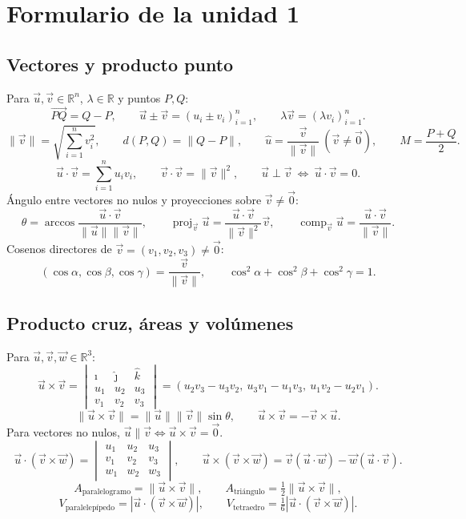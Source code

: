 ﻿\section{Formulario de la unidad 1}
\begingroup
\small
\setlength{\parindent}{0pt}
\setlength{\abovedisplayskip}{7pt}
\setlength{\belowdisplayskip}{7pt}

\subsection*{Vectores y producto punto}
Para $\vec u,\vec v\in\mathbb R^n$, $\lambda\in\mathbb R$ y puntos $P,Q$:
\[
\overrightarrow{PQ}=Q-P,\qquad
\vec u\pm\vec v=(u_i\pm v_i)_{i=1}^n,\qquad
\lambda\vec v=(\lambda v_i)_{i=1}^n.
\]
\[
\|\vec v\|=\sqrt{\sum_{i=1}^n v_i^2},\qquad
d(P,Q)=\|Q-P\|,\qquad
\hat u=\frac{\vec v}{\|\vec v\|}\ (\vec v\ne\vec0),\qquad
M=\frac{P+Q}{2}.
\]
\[
\vec u\cdot\vec v=\sum_{i=1}^n u_iv_i,\qquad
\vec v\cdot\vec v=\|\vec v\|^2,\qquad
\vec u\perp\vec v\ \Longleftrightarrow\ \vec u\cdot\vec v=0.
\]
Ángulo entre vectores no nulos y proyecciones sobre $\vec v\ne\vec0$:
\[
\theta=\arccos\frac{\vec u\cdot\vec v}{\|\vec u\|\|\vec v\|},\qquad
\operatorname{proj}_{\vec v}\vec u=\frac{\vec u\cdot\vec v}{\|\vec v\|^2}\vec v,
\qquad
\operatorname{comp}_{\vec v}\vec u=\frac{\vec u\cdot\vec v}{\|\vec v\|}.
\]
Cosenos directores de $\vec v=(v_1,v_2,v_3)\ne\vec0$:
\[
(\cos\alpha,\cos\beta,\cos\gamma)=\frac{\vec v}{\|\vec v\|},
\qquad \cos^2\alpha+\cos^2\beta+\cos^2\gamma=1.
\]

\subsection*{Producto cruz, áreas y volúmenes}
Para $\vec u,\vec v,\vec w\in\mathbb R^3$:
\[
\vec u\times\vec v
=\begin{vmatrix}\hat\imath&\hat\jmath&\hat k\\u_1&u_2&u_3\\v_1&v_2&v_3\end{vmatrix}
=(u_2v_3-u_3v_2,\ u_3v_1-u_1v_3,\ u_1v_2-u_2v_1).
\]
\[
\|\vec u\times\vec v\|=\|\vec u\|\|\vec v\|\sin\theta,
\qquad \vec u\times\vec v=-\vec v\times\vec u.
\]
Para vectores no nulos, $\vec u\parallel\vec v\Longleftrightarrow\vec u\times\vec v=\vec0$.
\[
\vec u\cdot(\vec v\times\vec w)
=\begin{vmatrix}u_1&u_2&u_3\\v_1&v_2&v_3\\w_1&w_2&w_3\end{vmatrix},\qquad
\vec u\times(\vec v\times\vec w)=\vec v(\vec u\cdot\vec w)-\vec w(\vec u\cdot\vec v).
\]
\[
A_{\text{paralelogramo}}=\|\vec u\times\vec v\|,\qquad
A_{\text{triángulo}}=\tfrac12\|\vec u\times\vec v\|,
\]
\[
V_{\text{paralelepípedo}}=|\vec u\cdot(\vec v\times\vec w)|,\qquad
V_{\text{tetraedro}}=\tfrac16|\vec u\cdot(\vec v\times\vec w)|.
\]

